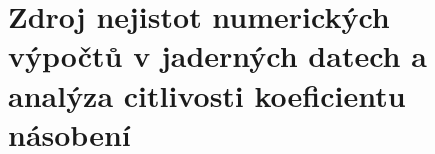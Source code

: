 \section[Citlivostní analýza]{Zdroj nejistot numerických výpočtů v jaderných datech a analýza citlivosti koeficientu násobení}